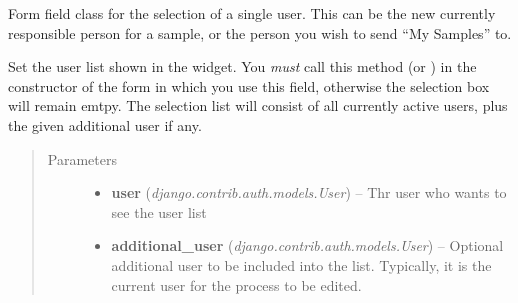 \documentclass[a4paper,11pt,english]{sphinxmanual}
\begin{document}
\begin{fulllineitems}
\label{programming/utilities:jb_common.utils.views.UserField}
Form field class for the selection of a single user.  This can be the
new currently responsible person for a sample, or the person you wish to
send “My Samples” to.

\begin{fulllineitems}
\label{programming/utilities:jb_common.utils.views.UserField.set_users}
Set the user list shown in the widget.  You \emph{must} call this method (or
{\hyperref[programming/utilities:jb_common.utils.views.UserField.set_users_without]{}}) in the
constructor of the form in which you use this field, otherwise the
selection box will remain emtpy.  The selection list will consist of
all currently active users, plus the given additional user if any.
\begin{quote}\begin{description}
\item[{Parameters}] \leavevmode\begin{itemize}
\item {} 
\textbf{user} (\emph{django.contrib.auth.models.User}) -- Thr user who wants to see the user list

\item {} 
\textbf{additional\_user} (\emph{django.contrib.auth.models.User}) -- Optional additional user to be included into the
list.  Typically, it is the current user for the process to be
edited.

\end{itemize}

\end{description}\end{quote}

\end{fulllineitems}



\end{fulllineitems}
\end{document}
